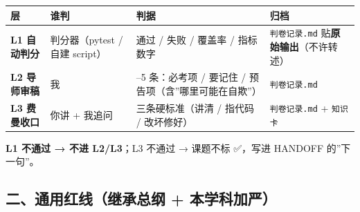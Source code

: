 \documentclass[
  chinese,
  11pt,
]{ctexart}
\newcounter{none} %
\begin{document}
{\def\LTcaptype{none} %
\begin{longtable}[]{@{}
  >{\raggedright\arraybackslash}p{}
  >{\raggedright\arraybackslash}p{}
  >{\raggedright\arraybackslash}p{}
  >{\raggedright\arraybackslash}p{}@{}}
\toprule\noalign{}
\begin{minipage}[b]{\linewidth}\raggedright
层
\end{minipage} & \begin{minipage}[b]{\linewidth}\raggedright
谁判
\end{minipage} & \begin{minipage}[b]{\linewidth}\raggedright
判据
\end{minipage} & \begin{minipage}[b]{\linewidth}\raggedright
归档
\end{minipage} \\
\midrule\noalign{}
\endhead
\bottomrule\noalign{}
\endlastfoot
\textbf{L1 自动判分} & 判分器（pytest / 自建 script） & 通过 / 失败 / 覆盖率 / 指标数字 & \texttt{判卷记录.md} 贴\textbf{原始输出}（不许转述） \\
\textbf{L2 导师审稿} & 我 & 3--5 条：必考项 / 要记住 / 预告项（含''哪里可能在自欺''） & \texttt{判卷记录.md} \\
\textbf{L3 费曼收口} & 你讲 + 我追问 & 三条硬标准（讲清 / 指代码 / 改坏修好） & \texttt{判卷记录.md} + \texttt{知识卡} \\
\end{longtable}
}

\textbf{L1 不通过 → 不进 L2/L3}；L3 不通过 → 课题不标 ✅，写进 HANDOFF 的''下一句''。

\subsection{二、通用红线（继承总纲 + 本学科加严）}\label{ux4e8cux901aux7528ux7ea2ux7ebfux7ee7ux627fux603bux7eb2-ux672cux5b66ux79d1ux52a0ux4e25}
\end{document}
